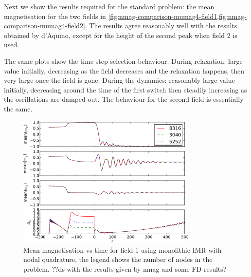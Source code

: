 Next we show the results required for the standard problem: the mean magnetisation for the two fields in \cref{fig:nmag-comparison-mumag4-field1,fig:nmag-comparison-mumag4-field2}.
The results agree reasonably well with the results obtained by d'Aquino, except for the height of the second peak when field 2 is used.

The same plots show the time step selection behaviour.
During relaxation: large value initially, decreasing as the field decreases and the relaxation happens, then very large once the field is gone.
During the dynamics: reasonably large value initially, decreasing around the time of the first switch then steadily increasing as the oscillations are damped out.
The behaviour for the second field is essentially the same.

\begin{figure}
  \centering
  \includegraphics[width=0.8\textwidth]{plots/mumag4_convergence/mumag4_field1-meanmxsvs-meanmysvs-meanmzsvs-dtsvstimes.pdf}
  \caption{Mean magnetisation vs time for field 1 using monolithic IMR with nodal quadrature, the legend shows the number of nodes in the problem.
    ??ds with the results given by nmag and some FD results?}
  \label{fig:nmag-comparison-mumag4-field1}
\end{figure}

